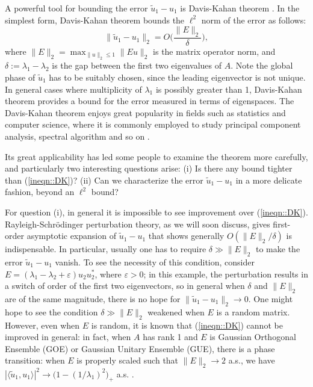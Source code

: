 \documentclass[12pt]{article}%
\theoremstyle{plain}%
\theoremstyle{remark}
\begin{document}
A powerful tool for bounding the error $\tilde{u}_1 - u_1$ is Davis-Kahan theorem \citep{DavKah70}. In the simplest form, Davis-Kahan theorem bounds the $\ell^2$ norm of the error as follows:
\begin{equation}\label{ineqn::DK}
\| \tilde{u}_1 - u_1 \|_2 = O\Big( \frac{ \| E \|_2 }{\delta} \Big),
\end{equation}
where $\| E \|_2 = \max_{\| u \|_2 \le 1} \| E u \|_2$ is the matrix operator norm, and $\delta := \lambda_1 - \lambda_2$ is the gap between the first two eigenvalues of $A$. Note the global phase of $\tilde{u}_1$ has to be suitably chosen, since the leading eigenvector is not unique. In general cases where multiplicity of $\lambda_1$ is possibly greater than 1, Davis-Kahan theorem provides a bound for the error measured in terms of eigenspaces. 
The Davis-Kahan theorem enjoys great popularity in fields such as statistics and computer science, where it is commonly employed to study principal component analysis, spectral algorithm and so on \citep{Von07,RohChaYu11, fan2013large}.

Its great applicability has led some people to examine the theorem more carefully, and particularly two interesting questions arise: (i) Is there any bound tighter than (\ref{ineqn::DK})? (ii) Can we characterize the error $\tilde{u}_1 - u_1$ in a more delicate fashion, beyond an $\ell^2$ bound?

For question (i), in general it is impossible to see improvement over (\ref{ineqn::DK}). Rayleigh-Schr\"{o}dinger perturbation theory, as we will soon discuss, gives first-order asymptotic expansion of $\tilde{u}_1 - u_1$ that shows generally $O(\| E \|_2 / \delta)$ is indispensable. In particular, usually one has to require $\delta \gg \| E \|_2$ to make the error $\tilde{u}_1 - u_1$ vanish. To see the necessity of this condition, consider $E = (\lambda_1 - \lambda_2 + \varepsilon) u_2 u_2^*$, where $\varepsilon > 0$; in this example, the perturbation results in a switch of order of the first two eigenvectors, so in general when $\delta$ and $\| E\|_2$ are of the same magnitude, there is no hope for $\|\tilde{u}_1 - u_1 \|_2 \to 0$. One might hope to see the condition $\delta \gg \| E \|_2$ weakened when $E$ is a random matrix. However, even when $E$ is random, it is known that (\ref{ineqn::DK}) cannot be improved in general: in fact, when $A$ has rank 1 and $E$ is Gaussian Orthogonal Ensemble (GOE) or Gaussian Unitary Ensemble (GUE), there is a phase transition: when $E$ is properly scaled such that $\| E \|_2 \to 2$ a.s., we have $|\langle \tilde{u}_1, u_1 \rangle|^2 \to \big( 1 - (1/\lambda_1)^2 \big)_+$ a.s.  \citep{Ben11}.     
\end{document}
